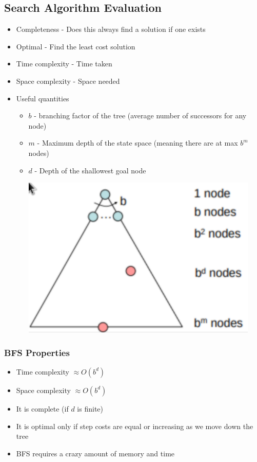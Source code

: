 \documentclass[11pt]{article}
\begin{document}
\subsection{Search Algorithm Evaluation}
\label{sec:orgda1b6e8}
\begin{itemize}
\item Completeness - Does this always find a solution if one exists
\item Optimal - Find the least cost solution
\item Time complexity - Time taken
\item Space complexity - Space needed
\item Useful quantities
\begin{itemize}
\item \(b\) - branching factor of the tree (average number of successors for any node)
\item \(m\) - Maximum depth of the state space (meaning there are at max \(b^m\) nodes)
\item \(d\) - Depth of the shallowest goal node
\begin{center}
\includegraphics[width=.9\linewidth]{images/2020-09-03_16-49-29_screenshot.png}
\end{center}
\end{itemize}
\end{itemize}
\subsubsection{BFS Properties}
\label{sec:org3f4afe1}
\begin{itemize}
\item Time complexity \(\approx O(b^d)\)
\item Space complexity \(\approx O(b^d)\)
\item It is complete (if \(d\) is finite)
\item It is optimal only if step costs are equal or increasing as we move down the tree
\item BFS requires a crazy amount of memory and time
\end{itemize}
\end{document}
